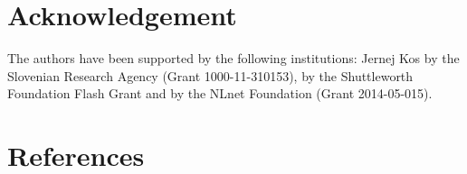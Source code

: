 \documentclass[5p,sort&compress]{elsarticle}
\begin{document}
\section*{Acknowledgement}

The authors have been supported by the following institutions: Jernej Kos by the Slovenian Research Agency (Grant 1000-11-310153), by the Shuttleworth Foundation Flash Grant and by the NLnet Foundation (Grant 2014-05-015).


\section*{References}

\end{document}
